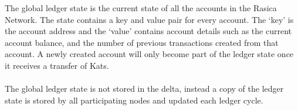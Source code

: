 The global ledger state is the current state of all the accounts in the Rasica Network. The state contains a key and value pair for every account. The `key' is the account address and the `value' contains account details such as the current account balance, and the number of previous transactions created from that account. A newly created account will only become part of the ledger state once it receives a transfer of Kats.
\\
\\
The global ledger state is not stored in the delta, instead a copy of the ledger state is stored by all participating nodes and updated each ledger cycle.